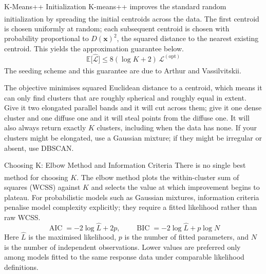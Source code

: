 \begin{v3topic}{K-Means++ Initialization}
    K-means++ improves the standard random initialization by spreading the initial centroids across the data\textsuperscript{\cite[][pp.~168--169]{iiiCourseMachineLearning}}. The first centroid is chosen uniformly at random; each subsequent centroid is chosen with probability proportional to $D(\mathbf{x})^2$, the squared distance to the nearest existing centroid. This yields the approximation guarantee below.
\visualseparator
    \begin{equation}
        \mathbb{E}\bigl[\hat{\mathcal{L}}\bigr] \leq 8(\log K + 2)\,\mathcal{L}^{(\mathrm{opt})}
        \label{eq:ml-kmeanspp}
    \end{equation}
    The seeding scheme and this guarantee are due to Arthur and
    Vassilvitskii\textsuperscript{\cite{arthurKmeansAdvantagesCareful2007}}.

\begin{cautionbox}
The objective minimises squared Euclidean distance to a centroid, which means
it can only find clusters that are roughly spherical and roughly equal in
extent. Give it two elongated parallel bands and it will cut across them; give
it one dense cluster and one diffuse one and it will steal points from the
diffuse one. It will also always return exactly $K$ clusters, including when
the data has none. If your clusters might be elongated, use a Gaussian mixture;
if they might be irregular or absent, use DBSCAN.
\end{cautionbox}

\end{v3topic}
\begin{v3topic}{Choosing K: Elbow Method and Information Criteria}
    There is no single best method for choosing $K$\textsuperscript{\cite[][p.169]{iiiCourseMachineLearning}}. The elbow method plots the within-cluster sum of squares (WCSS) against $K$ and selects the value at which improvement begins to plateau. For probabilistic models such as Gaussian mixtures, information criteria penalise model complexity explicitly; they require a fitted likelihood rather than raw WCSS.
\visualseparator
    \begin{equation}
        \operatorname{AIC} = -2\log \hat L + 2p,
        \qquad
        \operatorname{BIC} = -2\log \hat L + p\log N
    \end{equation}
    Here $\hat L$ is the maximised likelihood, $p$ is the number of fitted parameters, and $N$ is the number of independent observations. Lower values are preferred only among models fitted to the same response data under comparable likelihood definitions.
\end{v3topic}

